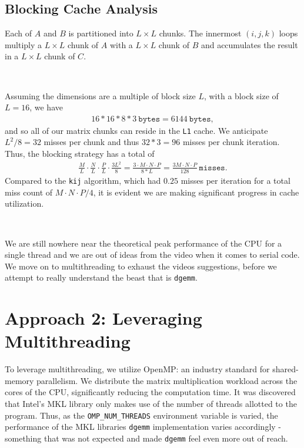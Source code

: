 \documentclass{article}
\begin{document}
\subsection{Blocking Cache Analysis}
Each of $A$ and $B$ is partitioned into $L \times L$ chunks. 
The innermost $(i,j,k)$ loops multiply a $L \times L$ chunk of $A$ with a
$L \times L$ chunk of $B$ and accumulates the 
result in a $L \times L$ chunk of $C$.

\

\noindent Assuming the dimensions are a multiple of block size $L$, with a block size of $L = 16$, we have 
\begin{align*}
    16 * 16 * 8 * 3 \ \texttt{bytes} = 6144\ \texttt{bytes},
\end{align*}
and so all of our matrix chunks can reside in the \texttt{L1} cache. We anticipate 
$L^2 / 8 = 32$ misses per chunk and thus $32 * 3 = 96$ misses per chunk iteration. 
Thus, the blocking strategy has a total of 
\begin{align*}
    \frac{M}{L} \cdot \frac{N}{L} \cdot \frac{P}{L} \cdot \frac{3 L^2}{8} = \frac{3 \cdot M \cdot N \cdot P}{8 * L} = \frac{3M\cdot N \cdot P}{128}\ \texttt{misses}.
\end{align*}
Compared to the \texttt{kij} algorithm, which had $0.25$ misses per iteration for a total miss count of $M\cdot N \cdot P / 4$, it 
is evident we are making significant progress in cache utilization.

\

\noindent We are still nowhere near the theoretical peak performance of the CPU for a single thread and we are 
out of ideas from the video when it comes to serial code. We move on to multithreading 
to exhaust the videos suggestions, before we attempt to really understand the beast that is \texttt{dgemm}.

\section{Approach 2: Leveraging Multithreading}

To leverage multithreading, we utilize OpenMP: an industry standard for 
shared-memory parallelism. We distribute the matrix multiplication workload 
across the cores of the CPU, significantly reducing the computation time. 
It was discovered that Intel's MKL library only makes use of the number of 
threads allotted to the program. Thus, as the \texttt{OMP\_NUM\_THREADS} environment variable is varied, 
the performance of the MKL libraries \texttt{dgemm} implementation varies accordingly 
- something that was not expected and made \texttt{dgemm} feel even more out of reach.
\end{document}
